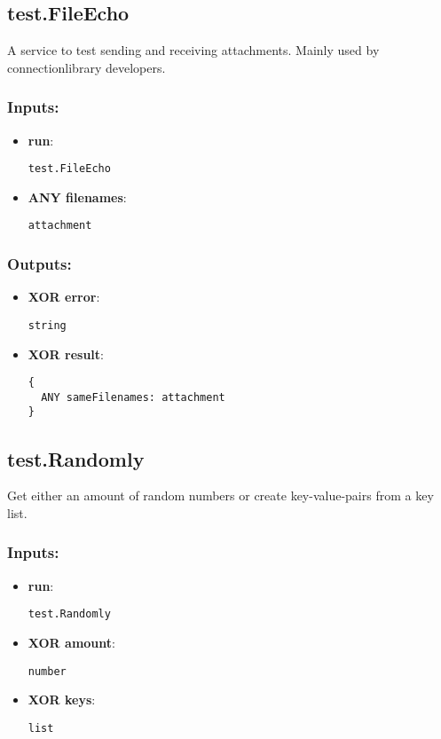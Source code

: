 \subsection{test.FileEcho}
\label{ch:builtinservices:test.FileEcho}
A service to test sending and receiving attachments. Mainly used by connectionlibrary developers.
\subsubsection*{Inputs:}
\begin{itemize}
    \item \textbf{run}: 
\begin{lstlisting}
test.FileEcho
\end{lstlisting}
    \item \textbf{ANY filenames}: 
\begin{lstlisting}
attachment
\end{lstlisting}
  \end{itemize}

\subsubsection*{Outputs:}
\begin{itemize}
    \item \textbf{XOR error}: 
\begin{lstlisting}
string
\end{lstlisting}
    \item \textbf{XOR result}: 
\begin{lstlisting}
{
  ANY sameFilenames: attachment
}
\end{lstlisting}
  \end{itemize}

\subsection{test.Randomly}
\label{ch:builtinservices:test.Randomly}
Get either an amount of random numbers or create key-value-pairs from a key list.
\subsubsection*{Inputs:}
\begin{itemize}
    \item \textbf{run}: 
\begin{lstlisting}
test.Randomly
\end{lstlisting}
    \item \textbf{XOR amount}: 
\begin{lstlisting}
number
\end{lstlisting}
    \item \textbf{XOR keys}: 
\begin{lstlisting}
list
\end{lstlisting}
  \end{itemize}

